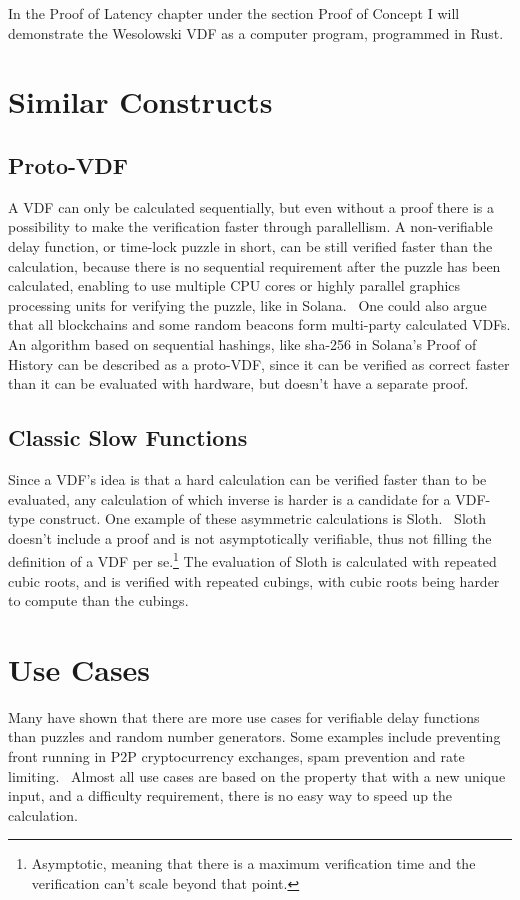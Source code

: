 In the Proof of Latency chapter under the section Proof of Concept I will demonstrate the Wesolowski VDF as a computer program, programmed in Rust.


\section{Similar Constructs}
\subsection{Proto-VDF}
A VDF can only be calculated sequentially, but even without a proof there is a possibility to make the verification faster through parallellism. A non-verifiable delay function, or time-lock puzzle in short, can be still verified faster than the calculation, because there is no sequential requirement after the puzzle has been calculated, enabling to use multiple CPU cores or highly parallel graphics processing units for verifying the puzzle, like in Solana.~\cite{Yakovenko2018-zn} One could also argue that all blockchains and some random beacons form multi-party calculated VDFs. An algorithm based on sequential hashings, like sha-256 in Solana's Proof of History can be described as a proto-VDF, since it can be verified as correct faster than it can be evaluated with hardware, but doesn't have a separate proof.

\subsection{Classic Slow Functions}
Since a VDF's idea is that a hard calculation can be verified faster than to be evaluated, any calculation of which inverse is harder is a candidate for a VDF-type construct. One example of these asymmetric calculations is Sloth.~\cite{Boneh2018-sm} Sloth doesn't include a proof and is not asymptotically verifiable, thus not filling the definition of a VDF per se.\footnote{Asymptotic, meaning that there is a maximum verification time and the verification can't scale beyond that point.} The evaluation of Sloth is calculated with repeated cubic roots, and is verified with repeated cubings, with cubic roots being harder to compute than the cubings.

\section{Use Cases}
Many have shown that there are more use cases for verifiable delay functions than puzzles and random number generators. Some examples include preventing front running in P2P cryptocurrency exchanges, spam prevention and rate limiting.~\cite{noauthor_undated-hk} Almost all use cases are based on the property that with a new unique input, and a difficulty requirement, there is no easy way to speed up the calculation.

